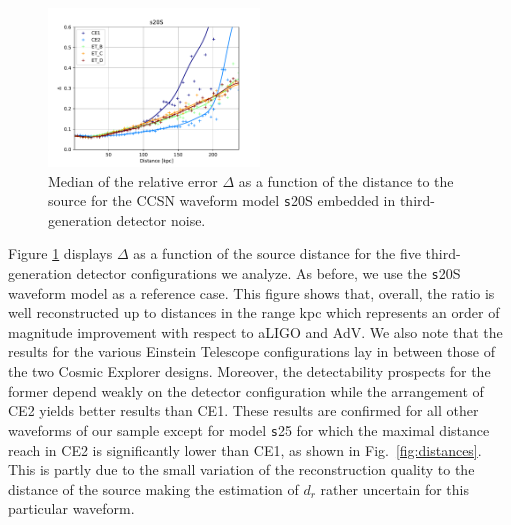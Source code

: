 \begin{figure}[t]
  \centering
  \includegraphics[width=0.5\textwidth]{plots/s20--SFHo_all3G}
  \caption{Median of the relative error $\Delta$ as a function of the  distance to the source for the CCSN waveform model {\texttt s20S} embedded in third-generation detector noise. }
  \label{fig:s20--SFHo_all3G}
\end{figure}

Figure \ref{fig:s20--SFHo_all3G} displays $\Delta$ as a function of the source distance for the five third-generation detector configurations we analyze. As before, we use the {\texttt s20S} waveform model as a reference case.  This figure shows that,  overall, the ratio is well reconstructed up to distances in the range \unit[100--200]{kpc} which represents an order of magnitude improvement with respect to aLIGO and AdV. We also note that the results for the various Einstein Telescope configurations lay in between those of the two Cosmic Explorer designs. Moreover,  the detectability prospects for the former depend weakly on the detector configuration while the arrangement of CE2 yields better results than CE1. These results are confirmed for all other waveforms of our sample except for model {\texttt s25} for which the maximal distance reach in CE2 is significantly lower than CE1, as shown in Fig.~\ref{fig:distances}. This is partly due to the small variation of the reconstruction quality to the distance of the source making the estimation of $d_r$ rather uncertain for this particular waveform. 

